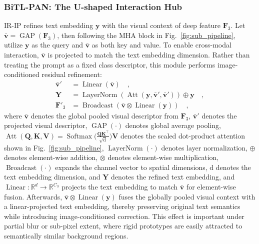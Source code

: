 \documentclass[letterpaper, 10 pt, conference]{ieeeconf}  %
\newcommand{\mathopfont}[1]{\mathop{\mathrm{#1}}\nolimits}
\begin{document}
\subsubsection{BiTL-PAN: The U-shaped Interaction Hub}
\label{subsec:bitl-pan}
IR-IP refines text embedding $\mathbf{y}$ with the visual context of deep feature $\mathbf{F}_3$. Let $\bar{\mathbf{v}}=\mathopfont{GAP}(\mathbf{F}_3)$, then following the MHA block in Fig.~\ref{fig:sub_pipeline}, utilize $\mathbf{y}$ as the query and $\bar{\mathbf{v}}$ as both key and value. To enable cross-modal interaction, $\bar{\mathbf{v}}$ is projected to match the text embedding dimension. Rather than treating the prompt as a fixed class descriptor, this module performs image-conditioned residual refinement:
\begin{align}
\bar{\mathbf{v}}' &= \mathopfont{Linear}(\bar{\mathbf{v}}) \quad, \\
\mathbf{Y} &= \mathopfont{LayerNorm}\!\left( \mathopfont{Att}(\mathbf{y},\bar{\mathbf{v}}',\bar{\mathbf{v}}') \right) \oplus \mathbf{y} \quad, \\
\mathbf{F}'_3 &= \mathopfont{Broadcast}\!\left( \bar{\mathbf{v}} \otimes \mathopfont{Linear}(\mathbf{y}) \right) \quad,
\end{align}
where $\bar{\mathbf{v}}$ denotes the global pooled visual descriptor from $\mathbf{F}_3$, $\bar{\mathbf{v}}'$ denotes the projected visual descriptor, $\mathopfont{GAP}(\cdot)$ denotes global average pooling, $\mathopfont{Att}(\mathbf{Q},\mathbf{K},\mathbf{V})=\mathopfont{Softmax}\big( \frac{\mathbf{Q}\mathbf{K}^\top}{\sqrt{\mathrm{d}}} \big)\mathbf{V}$ denotes the scaled dot-product attention shown in Fig.~\ref{fig:sub_pipeline}, $\mathopfont{LayerNorm}(\cdot)$ denotes layer normalization, $\oplus$ denotes element-wise addition, $\otimes$ denotes element-wise multiplication, $\mathopfont{Broadcast}(\cdot)$ expands the channel vector to spatial dimensions, $\mathrm{d}$ denotes the text embedding dimension, and $\mathbf{Y}$ denotes the refined text embedding, and $\mathopfont{Linear}: \mathbb{R}^{d} \rightarrow \mathbb{R}^{C_3}$ projects the text embedding to match $\bar{\mathbf{v}}$ for element-wise fusion. Afterwards, $\bar{\mathbf{v}} \otimes \mathopfont{Linear}(\mathbf{y})$ fuses the globally pooled visual context with a linear-projected text embedding, thereby preserving original text semantics while introducing image-conditioned correction. This effect is important under partial blur or sub-pixel extent, where rigid prototypes are easily attracted to semantically similar background regions.
\end{document}

